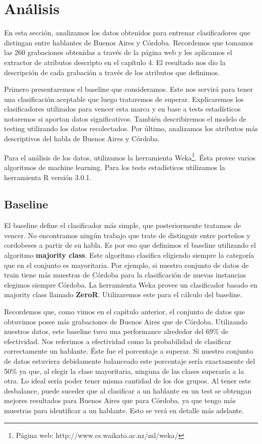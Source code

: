 
\chapter{Análisis}

En esta sección, analizamos los datos obtenidos para entrenar clasificadores que distingan entre hablantes de Buenos Aires y Córdoba. Recordemos que tomamos las 260 grabaciones obtenidas a través de la página web y les aplicamos el extractor de atributos descripto en el capítulo 4. El resultado nos dio la descripción de cada grabación a través de los atributos que definimos. 

Primero presentaremos el baseline que consideramos. Este nos servirá para tener una clasificación aceptable que luego trataremos de superar. Explicaremos los clasificadores utilizados para vencer esta marca y en base a tests estadísticos notaremos si aportan datos significativos. También describiremos el modelo de testing utilizando los datos recolectados. Por último, analizamos los atributos más descriptivos del habla de Buenos Aires y Córdoba. 

Para el análisis de los datos, utilizamos la herramienta Weka\footnote{Página web: http://www.cs.waikato.ac.nz/ml/weka/}. Ésta provee varios algoritmos de machine learning. Para los tests estadísticos utilizamos la herramienta R versión 3.0.1. 

\section{Baseline}

El baseline define el clasificador más simple, que posteriormente tratamos de vencer. No encontramos ningún trabajo que trate de distinguir entre porteños y cordobeses a partir de su habla. Es por eso que definimos el baseline utilizando el algoritmo \textbf{majority class}. Este algoritmo clasifica eligiendo siempre la categoría que en el conjunto es mayoritaria. Por ejemplo, si nuestro conjunto de datos de train tiene más muestras de Córdoba para la clasificación de nuevas instancias elegimos siempre Córdoba. La herramienta Weka provee un clasificador basado en majority class llamado \textbf{ZeroR}. Utilizaremos este para el cálculo del baseline. 

Recordemos que, como vimos en el capítulo anterior, el conjunto de datos que obtuvimos posee más grabaciones de Buenos Aires que de Córdoba. Utilizando nuestros datos, este baseline tuvo una performance alrededor del 69\% de efectividad. Nos referimos a efectividad como la probabilidad de clasificar correctamente un hablante. Éste fue el porcentaje a superar. Si nuestro conjunto de datos estuviera debidamente balanceado este porcentaje sería exactamente del 50\% ya que, al elegir la clase mayoritaria, ninguna de las clases superaría a la otra. Lo ideal sería poder tener misma cantidad de los dos grupos. Al tener este desbalance, puede suceder que al clasificar a un hablante en un test se obtengan mejores resultados para Buenos Aires que para Córdoba, ya que tengo más muestras para identificar a un hablante. Esto se verá en detalle más adelante.


